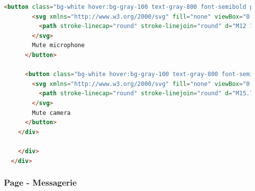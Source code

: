 \documentclass[12pt, a4paper, oneside]{article}
\begin{document}
\begin{lstlisting}[language=HTML, caption={Page - Réunions}, label=Page - Reunions]
      <button class="bg-white hover:bg-gray-100 text-gray-800 font-semibold py-2 px-4 border border-gray-400 rounded shadow flex items-center" id="toggle-mic-button" data-astro-cid-j7pv25f6="">
        <svg xmlns="http://www.w3.org/2000/svg" fill="none" viewBox="0 0 24 24" stroke-width="1.5" stroke="currentColor" class="w-6 h-6 mr-2" data-astro-cid-j7pv25f6="">
          <path stroke-linecap="round" stroke-linejoin="round" d="M12 18.75a6 6 0 006-6v-1.5m-6 7.5a6 6 0 01-6-6v-1.5m6 7.5v3.75m-3.75 0h7.5M12 15.75a3 3 0 01-3-3V4.5a3 3 0 116 0v8.25a3 3 0 01-3 3z" data-astro-cid-j7pv25f6=""></path>
        </svg>
        Mute microphone
      </button>
    
      <button class="bg-white hover:bg-gray-100 text-gray-800 font-semibold py-2 px-4 border border-gray-400 rounded shadow flex items-center" id="toggle-camera-button" data-astro-cid-j7pv25f6="">
        <svg xmlns="http://www.w3.org/2000/svg" fill="none" viewBox="0 0 24 24" stroke-width="1.5" stroke="currentColor" class="w-6 h-6 mr-2" data-astro-cid-j7pv25f6="">
          <path stroke-linecap="round" stroke-linejoin="round" d="M15.75 10.5l4.72-4.72a.75.75 0 011.28.53v11.38a.75.75 0 01-1.28.53l-4.72-4.72M12 18.75H4.5a2.25 2.25 0 01-2.25-2.25V9m12.841 9.091L16.5 19.5m-1.409-1.409c.407-.407.659-.97.659-1.591v-9a2.25 2.25 0 00-2.25-2.25h-9c-.621 0-1.184.252-1.591.659m12.182 12.182L2.909 5.909M1.5 4.5l1.409 1.409" data-astro-cid-j7pv25f6=""></path>
        </svg>
        Mute camera
      </button>
    </div>
  
    </div>
  </div>

\end{lstlisting}

\newpage

\subsubsection{Page - Messagerie}
\end{document}
